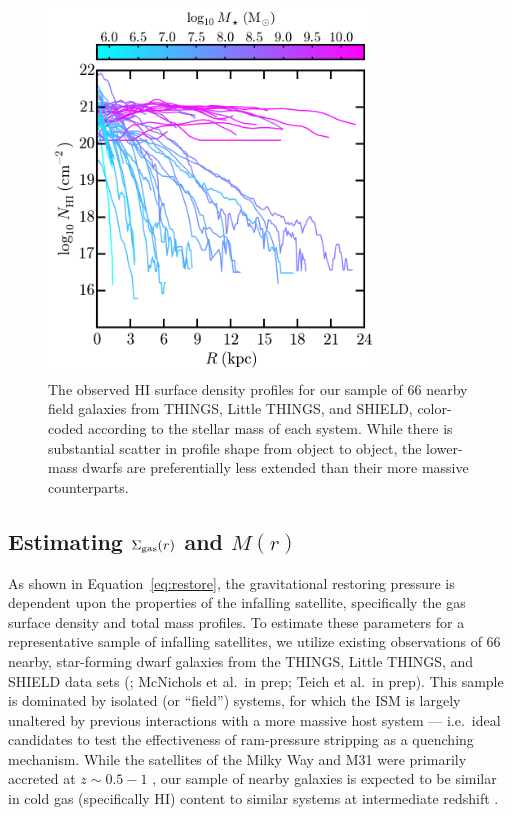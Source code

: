 \documentclass[usenatbib]{mn2e}
\begin{document}
\begin{figure}
 \centering
 \hspace*{-0.15in}
 \includegraphics[width=3.4in]{f2.png}
 \caption{The observed H{\scriptsize I} surface density profiles for
   our sample of $66$ nearby field galaxies from THINGS, Little
   THINGS, and SHIELD, color-coded according to the stellar mass of
   each system. While there is substantial scatter in profile shape
   from object to object, the lower-mass dwarfs are preferentially
   less extended than their more massive counterparts.}
 \label{fig:h1}
\end{figure}




\subsection{Estimating \boldmath$\Sigma_{\rm gas}(r)$ and \boldmath$M(r)$}
\label{subsec:sigM}

As shown in Equation~\ref{eq:restore}, the gravitational restoring
pressure is dependent upon the properties of the infalling satellite,
specifically the gas surface density and total mass profiles.
%
To estimate these parameters for a representative sample of infalling
satellites, we utilize existing observations of $66$ nearby,
star-forming dwarf galaxies from the THINGS, Little THINGS, and SHIELD
data sets (\citealt{walter08, hunter12, cannon11}; McNichols et al.~in
prep; Teich et al.~in prep). 
%
This sample is dominated by isolated (or ``field'') systems, for which
the ISM is largely unaltered by previous interactions with a more
massive host system --- i.e.~ideal candidates to test the
effectiveness of ram-pressure stripping as a quenching mechanism.
%
While the satellites of the Milky Way and M31 were primarily accreted
at $z \sim 0.5-1$ \citep{wetzel15a, fham15}, our sample of nearby
galaxies is expected to be similar in cold gas (specifically
H{\scriptsize I}) content to similar systems at intermediate redshift
\citep{popping15, somerville15}.
%
\end{document}
